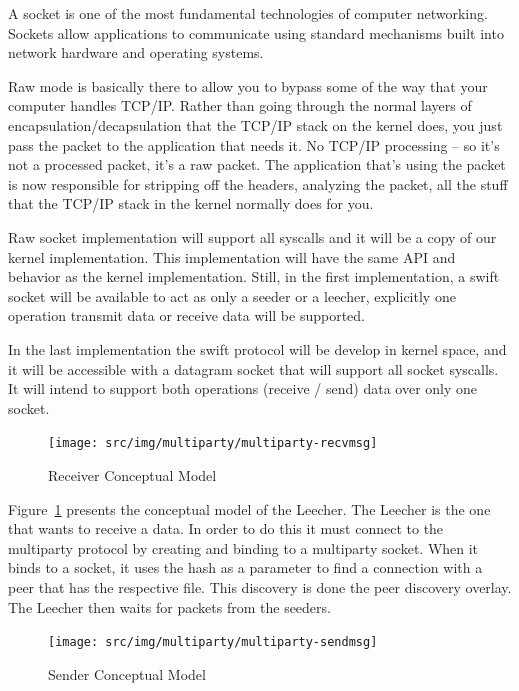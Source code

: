 A socket is one of the most fundamental technologies of computer networking.
Sockets allow applications to communicate using standard mechanisms built into
network hardware and operating systems.

Raw mode is basically there to allow you to bypass some of the way that your
computer handles TCP/IP. Rather than going through the normal layers of
encapsulation/decapsulation that the TCP/IP stack on the kernel does, you just
pass the packet to the application that needs it. No TCP/IP processing -- so
it's not a processed packet, it's a raw packet. The application that's using
the packet is now responsible for stripping off the headers, analyzing the
packet, all the stuff that the TCP/IP stack in the kernel normally does for
you.

Raw socket implementation will support all syscalls and it will be a copy of
our kernel implementation.  This implementation will have the same API and
behavior as the kernel implementation. Still, in the first implementation, a
swift socket will be available to act as only a seeder or a leecher,
explicitly one operation transmit data or receive data will be supported.

In the last implementation the swift protocol will be develop in kernel space,
and it will be accessible with a datagram socket that will support all socket
syscalls. It will intend to support both operations (receive / send) data over
only one socket.

\begin{figure}
  \centering
  \texttt{[image: src/img/multiparty/multiparty-recvmsg]}
  \caption{Receiver Conceptual Model}
  \label{fig:multiparty:multiparty-recvmsg}
\end{figure}

Figure~\ref{fig:multiparty:multiparty-recvmsg} presents the conceptual model
of the Leecher. The Leecher is the one that wants to receive a data. In order
to do this it must connect to the multiparty protocol by creating and binding
to a multiparty socket. When it binds to a socket, it uses the hash as a
parameter to find a connection with a peer that has the respective file. This
discovery is done the peer discovery overlay. The Leecher then waits for
packets from the seeders.

\begin{figure}
  \centering
  \texttt{[image: src/img/multiparty/multiparty-sendmsg]}
  \caption{Sender Conceptual Model}
  \label{fig:multiparty:multiparty-sendmsg}
\end{figure}

